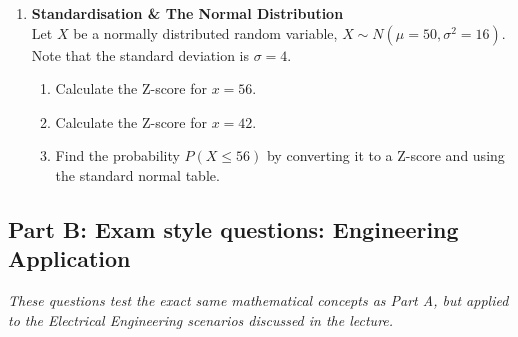\begin{enumerate}[label=\textbf{Q\arabic*.}, leftmargin=*]
    \item \textbf{Standardisation \& The Normal Distribution} \\
    Let $X$ be a normally distributed random variable, $X \sim N(\mu=50, \sigma^2=16)$. Note that the standard deviation is $\sigma = 4$.
    \begin{enumerate}[label=\arabic*.]
        \item Calculate the Z-score for $x = 56$.
        \item Calculate the Z-score for $x = 42$.
        \item Find the probability $P(X \leq 56)$ by converting it to a Z-score and using the standard normal table.
    \end{enumerate}

\end{enumerate}

\vspace{0.8cm}

\subsection*{Part B: Exam style questions: Engineering Application}
\textit{These questions test the exact same mathematical concepts as Part A, but applied to the Electrical Engineering scenarios discussed in the lecture.}


